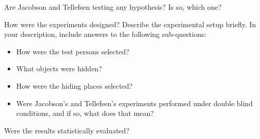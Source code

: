 \documentclass[a4paper,twoside=false,abstract=false,numbers=noenddot,
titlepage=false,headings=small,parskip=half,version=last]{scrartcl}
\begin{document}

\begin{exercise}{1} 
    Are Jacobson and Tellefsen testing any hypothesis? Is so, which one?
\end{exercise}
\begin{solution}

\end{solution}

\begin{exercise}{2} 
    How were the experiments designed? Describe the experimental setup briefly.
    In your description, include answers to the following sub-questions:
    \begin{itemize}
        \item How were the test persons selected?
        \item What objects were hidden?
        \item How were the hiding places selected?
        \item Were Jacobson's and Tellefsen's experiments performed under
        double blind conditions, and if so, what does that mean?
    \end{itemize}
\end{exercise}
\begin{solution}

\end{solution}
\begin{exercise}{3} 
    Were the results statistically evaluated?
\end{exercise}
\begin{solution}

\end{solution}

\end{document}

